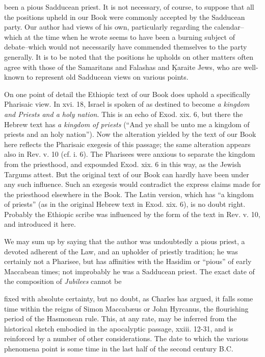 been a pious Sadducean priest. It is not necessary, of course, to suppose that all the positions upheld in our Book were commonly accepted by the Sadducean party. Our author had views of his own, particularly regarding the calendar--which at the time when he wrote seems to have been a burning subject of debate--which would not necessarily have commended themselves to the party generally. It is to be noted that the positions he upholds on other matters often agree with those of the Samaritans and Falashas and \d{K}araite Jews, who are well-known to represent old Sadducean views on various points.

On one point of detail the Ethiopic text of our Book does uphold a specifically Pharisaic view. In xvi. 18, Israel is spoken of as destined to become \emph{a kingdom and Priests and a holy nation}. This is an echo of Exod. xix. 6, but there the Hebrew text has \emph{a kingdom of priests} (``And ye shall be unto me a kingdom of priests and an holy nation''). Now the alteration yielded by the text of our Book here reflects the Pharisaic exegesis of this passage; the same alteration appears also in Rev. v. 10 (cf. i. 6). The Pharisees were anxious to separate the kingdom from the priesthood, and expounded Exod. xix. 6 in this way, as the Jewish Targums attest. But the original text of our Book can hardly have been under any such influence. Such an exegesis would contradict the express claims made for the priesthood elsewhere in the Book. The Latin version, which has ``a kingdom of priests'' (as in the original Hebrew text in Exod. xix. 6), is no doubt right. Probably the Ethiopic scribe was influenced by the form of the text in Rev. v. 10, and introduced it here.

We may sum up by saying that the author was undoubtedly a pious priest, a devoted adherent of the Law, and an upholder of priestly tradition; he was certainly not a Pharisee, but has affinities with the Hasidim or ``pious'' of early Maccabean times; not improbably he was a Sadducean priest. The exact date of the composition of \emph{Jubilees} cannot be

fixed with absolute certainty, but no doubt, as Charles has argued, it falls some time within the reigns of Simon Maccabæus or John Hyrcanus, the flourishing period of the Hasmonean rule. This, at any rate, may be inferred from the historical sketch embodied in the apocalyptic passage, xxiii. 12-31, and is reinforced by a number of other considerations. The date to which the various phenomena point is some time in the last half of the second century B.C.

